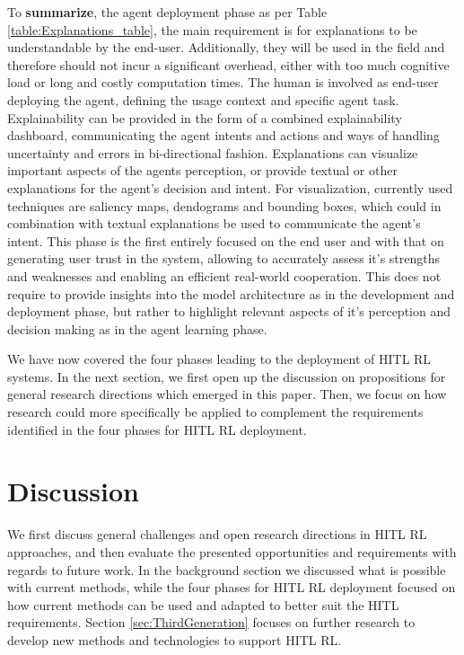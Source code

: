\documentclass[twoside,11pt]{article}
\begin{document}
\noindent To \textbf{summarize}, the agent deployment phase as per Table \ref{table:Explanations_table}, the main requirement is for explanations to be understandable by the end-user. Additionally, they will be used in the field and therefore should not incur a significant overhead, either with  too much cognitive load or long and costly computation times. The human is involved as end-user deploying the agent, defining the usage context and specific agent task. Explainability can be provided in the form of a combined explainability dashboard, communicating the agent intents and actions and ways of handling uncertainty and errors in bi-directional fashion. Explanations can visualize important aspects of the agents perception, or provide textual or other explanations for the agent's decision and intent. For visualization, currently used techniques are saliency maps, dendograms and bounding boxes, which could in combination with textual explanations be used to communicate the agent's intent. This phase is the first entirely focused on the end user and with that on generating user trust in the system, allowing to accurately assess it's strengths and weaknesses and enabling an efficient real-world cooperation. This does not require to provide insights into the model architecture as in the development and deployment phase, but rather to highlight relevant aspects of it's perception and decision making as in the agent learning phase.

We have now covered the four phases leading to the deployment of HITL RL systems. In the next section, we first open up the discussion on propositions for general research directions which emerged in this paper. Then, we focus on how research could more specifically be applied to complement the requirements identified in the four phases for HITL RL deployment.

\section{Discussion}
\label{sec:discussion}
We first discuss general challenges and open research directions in HITL RL approaches, and then evaluate the presented opportunities and requirements  with regards to future work. In the background section we discussed what is possible with current methods, while the four phases for HITL RL deployment focused on how current methods can be used and adapted to better suit the HITL requirements. Section \ref{sec:ThirdGeneration} focuses on further research to develop new methods and technologies to support HITL RL.
\end{document}

